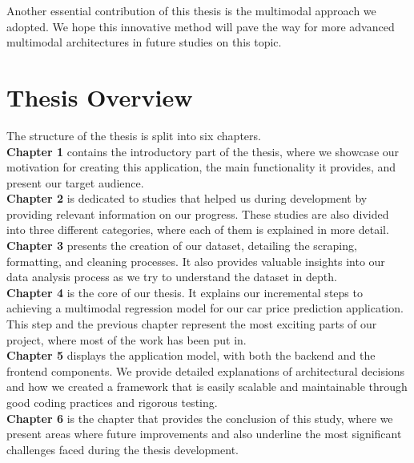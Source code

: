 Another essential contribution of this thesis is the multimodal approach we adopted. We hope this innovative method will pave the way for more advanced multimodal architectures in future studies on this topic.

\section{Thesis Overview}

The structure of the thesis is split into six chapters.
\\

\textbf{Chapter 1} contains the introductory part of the thesis, where we showcase our motivation for creating this application, the main functionality it provides, and present our target audience.
\\

\textbf{Chapter 2} is dedicated to studies that helped us during development by providing relevant information on our progress. These studies are also divided into three different categories, where each of them is explained in more detail.
\\

\textbf{Chapter 3} presents the creation of our dataset, detailing the scraping, formatting, and cleaning processes. It also provides valuable insights into our data analysis process as we try to understand the dataset in depth.
\\

\textbf{Chapter 4} is the core of our thesis. It explains our incremental steps to achieving a multimodal regression model for our car price prediction application. This step and the previous chapter represent the most exciting parts of our project, where most of the work has been put in.
\\

\textbf{Chapter 5} displays the application model, with both the backend and the frontend components. We provide detailed explanations of architectural decisions and how we created a framework that is easily scalable and maintainable through good coding practices and rigorous testing.
\\

\textbf{Chapter 6} is the chapter that provides the conclusion of this study, where we present areas where future improvements and also underline the most significant challenges faced during the thesis development.
\\

